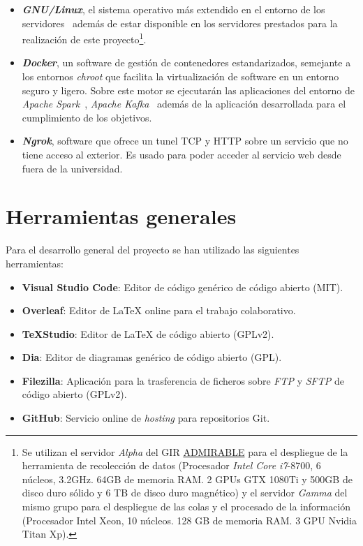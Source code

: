 \begin{itemize}
	\item \textit{\textbf{GNU/Linux}}, el sistema operativo más extendido en el entorno de los servidores~\cite{noauthorred2018, zhang2000linux} además de estar disponible en los servidores prestados para la realización de este proyecto\footnote{Se utilizan el servidor \textit{Alpha} del GIR \href{https://admirable-ubu.es/}{ADMIRABLE} para el despliegue de la herramienta de recolección de datos (Procesador \textit{Intel Core i7}-8700, 6 núcleos, 3.2GHz. 64GB de memoria RAM. 2 GPUs GTX 1080Ti y 500GB de disco duro sólido y 6 TB de disco duro magnético) y el servidor \textit{Gamma} del mismo grupo para el despliegue de las colas y el procesado de la información (Procesador Intel Xeon, 10 núcleos. 128 GB de memoria RAM. 3 GPU Nvidia Titan Xp).}.
	\item \textit{\textbf{Docker}}, un software de gestión de contenedores estandarizados, semejante a los entornos \textit{chroot} que facilita la virtualización de software en un entorno seguro y ligero. Sobre este motor se ejecutarán las aplicaciones del entorno de \textit{Apache Spark}~\cite{juez2019docker}, \textit{Apache Kafka}~\cite{confluentic2020docker} además de la aplicación desarrollada para el cumplimiento de los objetivos.
	\item \textit{\textbf{Ngrok}}, software que ofrece un tunel TCP y HTTP sobre un servicio que no tiene acceso al exterior. Es usado para poder acceder al servicio web desde fuera de la universidad.
\end{itemize}

\section{Herramientas generales}\label{sec:herramientasgenerales}

Para el desarrollo general del proyecto se han utilizado las siguientes herramientas:

\begin{itemize}
	\item \textbf{Visual Studio Code}: Editor de código genérico de código abierto (MIT).
	\item \textbf{Overleaf}: Editor de \LaTeX{} online para el trabajo colaborativo.
	\item \textbf{\TeX{}Studio}: Editor de \LaTeX{} de código abierto (GPLv2).
    \item \textbf{Dia}: Editor de diagramas genérico de código abierto (GPL).
    \item \textbf{Filezilla}: Aplicación para la trasferencia de ficheros sobre \textit{FTP} y \textit{SFTP} de código abierto (GPLv2).
    \item \textbf{GitHub}: Servicio online de \textit{hosting} para repositorios Git.
\end{itemize}
